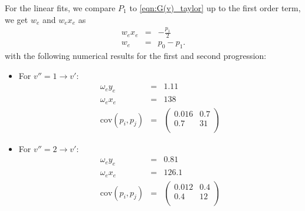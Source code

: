 For the linear fits, we compare $P_1$ to \eqref{eqn:G(v)_taylor} up to the first order 
term, we get $w_e$ and $w_e x_e$ as 
\begin{eqnarray}
    w_e x_e &=& -\frac{p_1}{2} \\
    w_e &=& p_0 - p_1.
\end{eqnarray}
with the following numerical results for the first and second progression: 
\begin{itemize}
    \item For $v'' = 1 \rightarrow v'$:
        \begin{eqnarray}
            \omega_e y_e &=&1.11 \\
            \omega_e x_e &=& 138 \\
            \mathrm{cov}(p_i, p_j) &=& 
            \begin{pmatrix}
                0.016 &0.7 \\
                0.7 & 31 \\
            \end{pmatrix}
        \end{eqnarray}
    \item For $v'' = 2 \rightarrow v'$:
        \begin{eqnarray}
            \omega_e y_e &=&0.81 \\
            \omega_e x_e &=&126.1 \\
            \mathrm{cov}(p_i, p_j) &=& 
            \begin{pmatrix}
                0.012 &0.4 \\
                0.4 & 12 \\
            \end{pmatrix}
        \end{eqnarray}
\end{itemize}


















